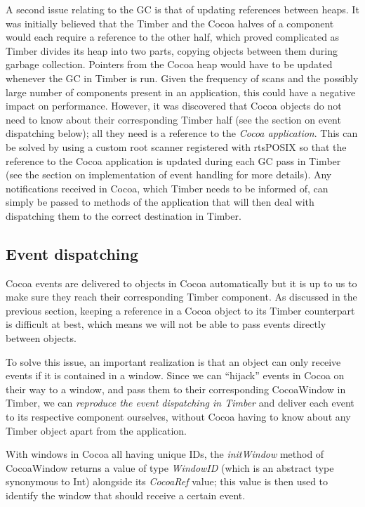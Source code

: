 \documentclass[a4paper]{article}
\begin{document}
A second issue relating to the GC is that of updating references between heaps. It was initially believed that the Timber and the Cocoa halves of a component would each require a reference to the other half, which proved complicated as Timber divides its heap into two parts, copying objects between them during garbage collection. Pointers from the Cocoa heap would have to be updated whenever the GC in Timber is run. Given the frequency of scans and the possibly large number of components present in an application, this could have a negative impact on performance. However, it was discovered that Cocoa objects do not need to know about their corresponding Timber half (see the section on event dispatching below); all they need is a reference to the  \textit{Cocoa application}. This can be solved by using a custom root scanner registered with rtsPOSIX so that the reference to the Cocoa application is updated during each GC pass in Timber (see the section on implementation of event handling for more details). Any notifications received in Cocoa, which Timber needs to be informed of, can simply be passed to methods of the application that will then deal with dispatching them to the correct destination in Timber.

\subsection{Event dispatching}
Cocoa events are delivered to objects in Cocoa automatically but it is up to us to make sure they reach their corresponding Timber component. As discussed in the previous section, keeping a reference in a Cocoa object to its Timber counterpart is difficult at best, which means we will not be able to pass events directly between objects.

To solve this issue, an important realization is that an object can only receive events if it is contained in a window. Since we can ``hijack'' events in Cocoa on their way to a window, and pass them to their corresponding CocoaWindow in Timber, we can \textit{reproduce the event dispatching in Timber} and deliver each event to its respective component ourselves, without Cocoa having to know about any Timber object apart from the application.

With windows in Cocoa all having unique IDs, the \textit{initWindow} method of CocoaWindow returns a value of type \textit{WindowID} (which is an abstract type synonymous to Int) alongside its \textit{CocoaRef} value; this value is then used to identify the window that should receive a certain event. 
\end{document}
